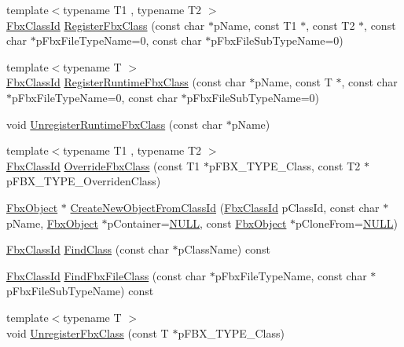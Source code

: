 \begin{DoxyCompactItemize}
\item 
{\footnotesize template$<$typename T1 , typename T2 $>$ }\\\hyperlink{class_fbx_class_id}{Fbx\+Class\+Id} \hyperlink{class_fbx_manager_aa1caacb212a16e40652f98331fd94500}{Register\+Fbx\+Class} (const char $\ast$p\+Name, const T1 $\ast$, const T2 $\ast$, const char $\ast$p\+Fbx\+File\+Type\+Name=0, const char $\ast$p\+Fbx\+File\+Sub\+Type\+Name=0)
\item 
{\footnotesize template$<$typename T $>$ }\\\hyperlink{class_fbx_class_id}{Fbx\+Class\+Id} \hyperlink{class_fbx_manager_ae7669c6398bfbe4bbf3fcb3206df17b0}{Register\+Runtime\+Fbx\+Class} (const char $\ast$p\+Name, const T $\ast$, const char $\ast$p\+Fbx\+File\+Type\+Name=0, const char $\ast$p\+Fbx\+File\+Sub\+Type\+Name=0)
\item 
void \hyperlink{class_fbx_manager_ab46a3ccf9aa7cf28f8b2b18223baeedb}{Unregister\+Runtime\+Fbx\+Class} (const char $\ast$p\+Name)
\item 
{\footnotesize template$<$typename T1 , typename T2 $>$ }\\\hyperlink{class_fbx_class_id}{Fbx\+Class\+Id} \hyperlink{class_fbx_manager_ab97e0e9c93a1f545ed814ece12bcad59}{Override\+Fbx\+Class} (const T1 $\ast$p\+F\+B\+X\+\_\+\+T\+Y\+P\+E\+\_\+\+Class, const T2 $\ast$p\+F\+B\+X\+\_\+\+T\+Y\+P\+E\+\_\+\+Overriden\+Class)
\item 
\hyperlink{class_fbx_object}{Fbx\+Object} $\ast$ \hyperlink{class_fbx_manager_a8e89142d374a3a06c406c62d6a204415}{Create\+New\+Object\+From\+Class\+Id} (\hyperlink{class_fbx_class_id}{Fbx\+Class\+Id} p\+Class\+Id, const char $\ast$p\+Name, \hyperlink{class_fbx_object}{Fbx\+Object} $\ast$p\+Container=\hyperlink{fbxarch_8h_a070d2ce7b6bb7e5c05602aa8c308d0c4}{N\+U\+LL}, const \hyperlink{class_fbx_object}{Fbx\+Object} $\ast$p\+Clone\+From=\hyperlink{fbxarch_8h_a070d2ce7b6bb7e5c05602aa8c308d0c4}{N\+U\+LL})
\item 
\hyperlink{class_fbx_class_id}{Fbx\+Class\+Id} \hyperlink{class_fbx_manager_a680992a09352225efbda1f3d76c9d495}{Find\+Class} (const char $\ast$p\+Class\+Name) const
\item 
\hyperlink{class_fbx_class_id}{Fbx\+Class\+Id} \hyperlink{class_fbx_manager_af3ef43f7605e2f29a49b86fdbf740364}{Find\+Fbx\+File\+Class} (const char $\ast$p\+Fbx\+File\+Type\+Name, const char $\ast$p\+Fbx\+File\+Sub\+Type\+Name) const
\item 
{\footnotesize template$<$typename T $>$ }\\void \hyperlink{class_fbx_manager_acaa996fbb60c38c9d015f18c91fa81be}{Unregister\+Fbx\+Class} (const T $\ast$p\+F\+B\+X\+\_\+\+T\+Y\+P\+E\+\_\+\+Class)
\end{DoxyCompactItemize}
